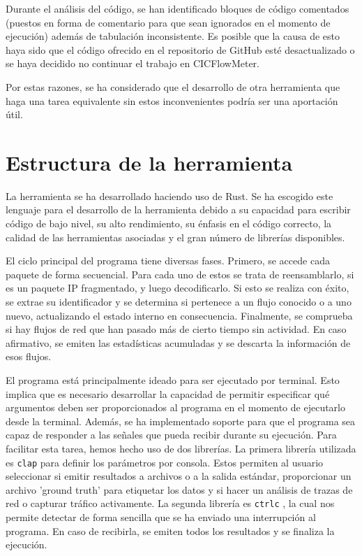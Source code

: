 \documentclass[10pt,a4paper,twoside]{article}
\begin{document}
\begin{multicols*}{2}
    Durante el análisis del código, se han identificado bloques de código comentados (puestos en forma de comentario para que sean ignorados en el momento de ejecución) además de tabulación inconsistente. Es posible que la causa de esto haya sido que el código ofrecido en el repositorio de GitHub esté desactualizado o se haya decidido no continuar el trabajo en CICFlowMeter.

    Por estas razones, se ha considerado que el desarrollo de otra herramienta que haga una tarea equivalente sin estos inconvenientes podría ser una aportación útil.

    \section{Estructura de la herramienta} \label{funcherramienta}

    La herramienta se ha desarrollado haciendo uso de Rust. Se ha escogido este lenguaje para el desarrollo de la herramienta debido a su capacidad para escribir código de bajo nivel, su alto rendimiento, su énfasis en el código correcto, la calidad de las herramientas asociadas y el gran número de librerías disponibles.

    El ciclo principal del programa tiene diversas fases. Primero, se accede cada paquete de forma secuencial. Para cada uno de estos se trata de reensamblarlo, si es un paquete IP fragmentado, y luego decodificarlo. Si esto se realiza con éxito, se extrae su identificador y se determina si pertenece a un flujo conocido o a uno nuevo, actualizando el estado interno en consecuencia. Finalmente, se comprueba si hay flujos de red que han pasado más de cierto tiempo sin actividad. En caso afirmativo, se emiten las estadísticas acumuladas y se descarta la información de esos flujos.

    El programa está principalmente ideado para ser ejecutado por terminal. Esto implica que es necesario desarrollar la capacidad de permitir especificar qué argumentos deben ser proporcionados al programa en el momento de ejecutarlo desde la terminal. Además, se ha implementado soporte para que el programa sea capaz de responder a las señales que pueda recibir durante su ejecución. Para facilitar esta tarea, hemos hecho uso de dos librerías. La primera librería utilizada es \texttt{clap} \cite{Knapp_clap_2024} para definir los parámetros por consola. Estos permiten al usuario seleccionar si emitir resultados a archivos o a la salida estándar, proporcionar un archivo 'ground truth' para etiquetar los datos y si hacer un análisis de trazas de red o capturar tráfico activamente. La segunda librería es \texttt{ctrlc} \cite{controlc}, la cual nos permite detectar de forma sencilla que se ha enviado una interrupción al programa. En caso de recibirla, se emiten todos los resultados y se finaliza la ejecución.


\end{multicols*}
\end{document}
